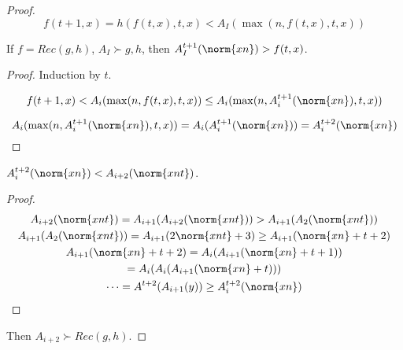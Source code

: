 \begin{proof}
$$f(t+1,x) = h(f(t,x),t,x) < A_I(\max(n, f(t,x), t, x))$$


\begin{lemma}
If $f = Rec(g,h)$, $A_I \succ g,h$, then $A_I^{t+1}(\norm{xn}) > f(t,x)$.
\end{lemma}

\begin{proof}
Induction by $t$.

$$f(t+1,x) < A_i(\max(n, f(t,x), t, x)) \le A_i(\max(n, A_i^{t+1}(\norm{xn}),t,x))$$

$$A_i(\max(n, A_i^{t+1}(\norm{xn}),t,x)) = A_i(A_i^{t+1}(\norm{xn})) = A_i^{t+2}(\norm{xn})$$
\end{proof}

\begin{lemma}
$A_{i}^{t+2}(\norm{xn}) < A_{i+2}(\norm{xnt})$.
\end{lemma}

\begin{proof}
\begin{gather*}
 A_{i+2}(\norm{xnt}) = A_{i+1}(A_{i+2}(\norm{xnt})) > A_{i+1}(A_{2}(\norm{xnt}))\\
 A_{i+1}(A_{2}(\norm{xnt})) = A_{i+1}(2\norm{xnt} +3) \ge A_{i+1}(\norm{xn}+t+2) \\
 A_{i+1}(\norm{xn}+t+2) = A_{i}(A_{i+1}(\norm{xn}+t+1))\\
 = A_i(A_i(A_{i+1}(\norm{xn}+t)))\\
 \cdots = A^{t+2}(A_{i+1}(y)) \ge A_i^{t+2}(\norm{xn})
\end{gather*}
\end{proof}

Then $A_{i+2} \succ Rec(g,h)$.
\end{proof}
